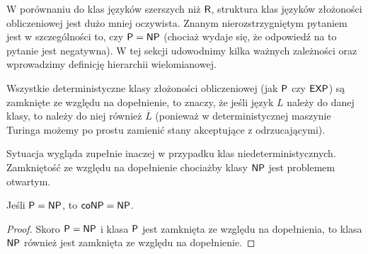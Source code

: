 W porównaniu do klas języków szerszych niż $\textsf{R}$, struktura klas języków złożoności obliczeniowej jest dużo mniej oczywista. Znanym nierozstrzygniętym pytaniem jest w szczególności to, czy $\textsf{P} = \textsf{NP}$ (chociaż wydaje się, że odpowiedź na to pytanie jest negatywna).
W tej sekcji udowodnimy kilka ważnych zależności oraz wprowadzimy definicję hierarchii wielomianowej.

\begin{remark}\label{r:classes closed under complement}
    Wszystkie deterministyczne klasy złożoności obliczeniowej (jak $\textsf{P}$ czy $\textsf{EXP}$) są zamknięte ze względu na dopełnienie, to znaczy, że jeśli język $L$ należy do danej klasy, to należy do niej również $\overline{L}$ (ponieważ w deterministycznej maszynie Turinga możemy po prostu zamienić stany akceptujące z odrzucającymi).

    Sytuacja wygląda zupełnie inaczej w przypadku klas niedeterministycznych. Zamkniętość ze względu na dopełnienie chociażby klasy $\textsf{NP}$ jest problemem otwartym.
\end{remark}

\begin{theorem}
    Jeśli $\textsf{P} = \textsf{NP}$, to $\textsf{coNP} = \textsf{NP}$.
\end{theorem}
\begin{proof}
    Skoro $\textsf{P} = \textsf{NP}$ i klasa $\textsf{P}$ jest zamknięta ze względu na dopełnienia, to klasa $\textsf{NP}$ również jest zamknięta ze względu na dopełnienie.
\end{proof}

